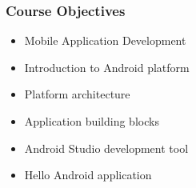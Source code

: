 %
%

\begin{frame}
  \frametitle{Course Objectives}
  
  \begin{itemize}
  \item Mobile Application Development
  \item Introduction to Android platform
  \item Platform architecture
  \item Application building blocks
  \item Android Studio development tool
  \item Hello Android application
  \end{itemize}

\end{frame}



